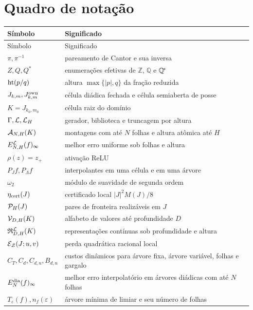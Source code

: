\section{Quadro de notação}
\label{app:notation}

\begin{longtable}{@{}>{\raggedright\arraybackslash}p{.27\linewidth}>{\raggedright\arraybackslash}p{.68\linewidth}@{}}
\toprule
Símbolo & Significado\\
\midrule
\endfirsthead
\toprule
Símbolo & Significado\\
\midrule
\endhead
$\pi,\pi^{-1}$ & pareamento de Cantor e sua inversa\\
$Z,Q,Q^{\!*}$ & enumerações efetivas de $\mathbb Z$, $\mathbb Q$ e $\mathbb{Q}^{\!*}$\\
$\operatorname{ht}(p/q)$ & altura $\max\{|p|,q\}$ da fração reduzida\\
$J_{k,m},J_{k,m}^{\mathrm{own}}$ & célula diádica fechada e célula semiaberta de posse\\
$K=J_{k_0,m_0}$ & célula raiz do domínio\\
$\Gamma,\mathcal{L},\mathcal{L}_H$ & gerador, biblioteca e truncagem por altura\\
$\mathcal{A}_{N,H}(K)$ & montagens com até $N$ folhas e altura atômica até $H$\\
$E_{N,H}^{\mathcal{L}}(f)_\infty$ & melhor erro uniforme sob folhas e altura\\
$\rho(z)=z_+$ & ativação ReLU\\
$P_Jf,P_\Lambda f$ & interpolantes em uma célula e em uma árvore\\
$\omega_2$ & módulo de suavidade de segunda ordem\\
$\eta_{\rm cert}(J)$ & certificado local $|J|^2M(J)/8$\\
$\mathcal{P}_H(J)$ & pares de fronteira realizáveis em $J$\\
$\mathcal{V}_{D,H}(K)$ & alfabeto de valores até profundidade $D$\\
$\mathfrak{R}_{D,H}^{\mathcal{L}}(K)$ & representações contínuas sob profundidade e altura\\
$\mathcal{E}_{\mathcal Z}(J;u,v)$ & perda quadrática racional local\\
$C_T,C_d,C_{d,n},B_{d,n}$ & custos dinâmicos para árvore fixa, árvore variável, folhas e gargalo\\
$E_N^{\rm dia}(f)_\infty$ & melhor erro interpolatório em árvores diádicas com até $N$ folhas\\
$T_\varepsilon(f),n_f(\varepsilon)$ & árvore mínima de limiar e seu número de folhas\\

\end{longtable}
